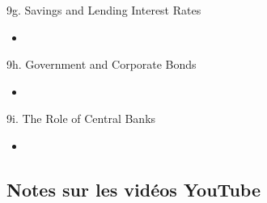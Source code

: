 \begin{CHPT_SUMM_AUTO}[label = {L.-9g}]{9g. Savings and Lending Interest Rates}
	\begin{itemize}
		\item	
	\end{itemize}
\end{CHPT_SUMM_AUTO}

\begin{CHPT_SUMM_AUTO}[label = {L.-9h}]{9h. Government and Corporate Bonds}
	\begin{itemize}
		\item	
	\end{itemize}
\end{CHPT_SUMM_AUTO}

\begin{CHPT_SUMM_AUTO}[label = {L.-9i}]{9i. The Role of Central Banks}
	\begin{itemize}
		\item	
	\end{itemize}
\end{CHPT_SUMM_AUTO}

\subsection{Notes sur les vidéos YouTube}

